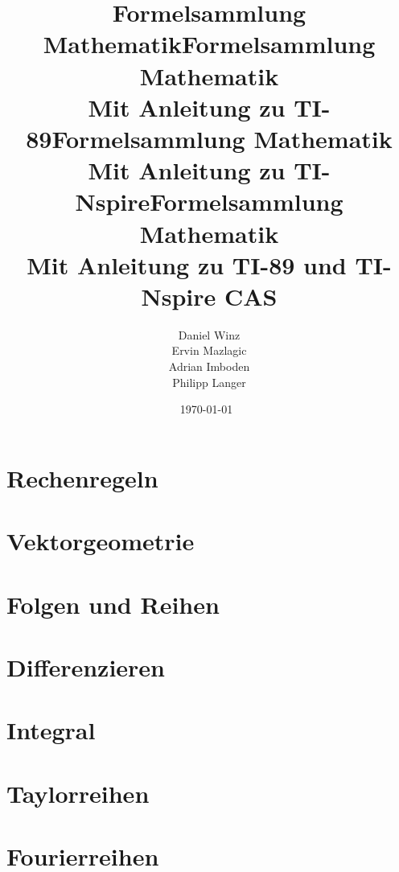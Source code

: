 \documentclass[a5paper,10pt,fleqn]{book}
\title{Formelsammlung Mathematik}
\title{Formelsammlung Mathematik \\ Mit Anleitung zu TI-89}
\title{Formelsammlung Mathematik \\ Mit Anleitung zu TI-Nspire}
\title{Formelsammlung Mathematik \\ Mit Anleitung zu TI-89 und TI-Nspire CAS}
\author{Daniel Winz\\Ervin Mazlagic\\Adrian Imboden\\Philipp Langer}
\date{\today~\dtc}
\begin{document}
\maketitle



\tableofcontents

\chapter{Rechenregeln}



\chapter{Vektorgeometrie}


\chapter{Folgen und Reihen}



\chapter{Differenzieren}




\chapter{Integral}




\chapter{Taylorreihen}


\chapter{Fourierreihen}

\end{document}
